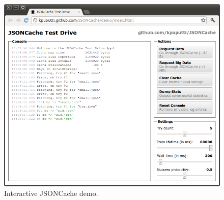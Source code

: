 \begin{figure}[ht]
  \begin{center}
    \includegraphics[width=\textwidth]{images/jsoncache-demo.png}
    \caption{Interactive JSONCache demo.}
    \label{figure:jsoncache-demo.png}
  \end{center}
\end{figure}
